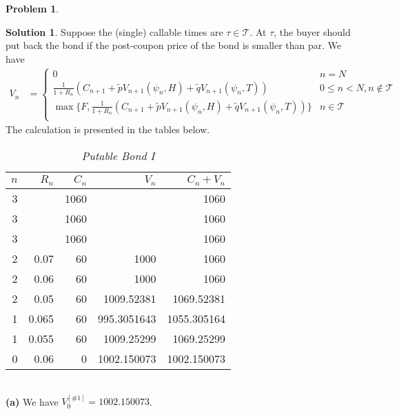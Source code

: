 \documentclass[a4paper, 10pt]{article}
\renewcommand{\arraystretch}{1.4}
\theoremstyle{definition}
\newtheorem{problem}{Problem}
\theoremstyle{hSol}
\newtheorem*{solution}{Solution}
\begin{document}
\begin{problem} 
\end{problem}
\begin{solution} Suppose the (single) callable times are $\tau \in \mathcal{T}$. At $\tau$, the buyer should put back the bond if the post-coupon price of the bond is smaller than par. We have
\begin{equation}
  \begin{split}
  V_n 
  &=\begin{cases}
  0 & n=N\\
  \frac{1}{1+R_{n}}\left(C_{n+1} + \tilde{p}V_{n+1}(\psi_n, H) + \tilde{q}V_{n+1}(\psi_n, T)\right) & 0\leq n < N, n\notin \mathcal{T}\\
  \max\{F, \frac{1}{1+R_{n}}\left(C_{n+1} + \tilde{p}V_{n+1}(\psi_n, H) + \tilde{q}V_{n+1}(\psi_n, T)\right)\} & n \in \mathcal{T} \\
  \end{cases}
  \end{split}
\end{equation}
The calculation is presented in the tables below.

\begin{table}[H]
  \centering
  \caption{\textit{Putable Bond I}}
  \vspace{-7pt}
  \def\arraystretch{1.15}
  \begin{tabular}{|r|rrrr|}
  \hline
  $n$ & $R_n$ & $C_n$ & $V_n$ & $C_n+V_n$\\
    \hline
    3     &       & 1060  &       & 1060 \\
    3     &       & 1060  &       & 1060 \\
    3     &       & 1060  &       & 1060 \\
    \hline
    2     & 0.07  & 60    & 1000  & 1060 \\
    2     & 0.06  & 60    & 1000  & 1060 \\
    2     & 0.05  & 60    & 1009.52381 & 1069.52381 \\
    \hline
    1     & 0.065 & 60    & 995.3051643 & 1055.305164 \\
    1     & 0.055 & 60    & 1009.25299 & 1069.25299 \\
    \hline
    0     & 0.06  & 0     & 1002.150073 & 1002.150073 \\
    \hline
    \end{tabular}%
  \label{tab:put1}%
\end{table}%
~\\ 
\textbf{(a)} We have $V_0^{[\#1]} = 1002.150073$.\\


\end{solution}
\end{document}
